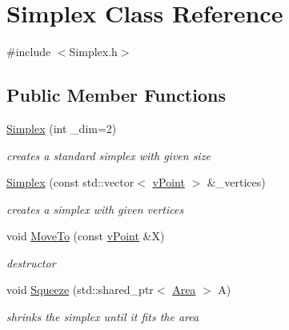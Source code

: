 \hypertarget{class_simplex}{}\section{Simplex Class Reference}
\label{class_simplex}


{\ttfamily \#include $<$Simplex.\+h$>$}

\subsection*{Public Member Functions}
\begin{DoxyCompactItemize}
\item 
\mbox{\label{class_simplex_a0556b901b7d46c7d4600aa5442f02585}} 
\hyperlink{class_simplex_a0556b901b7d46c7d4600aa5442f02585}{Simplex} (int \+\_\+dim=2)
\begin{DoxyCompactList}\small\item\em creates a standard simplex with given size \end{DoxyCompactList}\item 
\mbox{\label{class_simplex_ad227962dec843392bb95c02e106eb21c}} 
\hyperlink{class_simplex_ad227962dec843392bb95c02e106eb21c}{Simplex} (const std\+::vector$<$ \hyperlink{classv_point}{v\+Point} $>$ \&\+\_\+vertices)
\begin{DoxyCompactList}\small\item\em creates a simplex with given vertices \end{DoxyCompactList}\item 
void \hyperlink{class_simplex_a78284170bf58df27fcd5a8df6de283f3}{Move\+To} (const \hyperlink{classv_point}{v\+Point} \&X)
\begin{DoxyCompactList}\small\item\em destructor \end{DoxyCompactList}\item 
\mbox{\label{class_simplex_a8963be87ef81afde1c0865a71411eb1b}} 
void \hyperlink{class_simplex_a8963be87ef81afde1c0865a71411eb1b}{Squeeze} (std\+::shared\+\_\+ptr$<$ \hyperlink{class_area}{Area} $>$ A)
\begin{DoxyCompactList}\small\item\em shrinks the simplex until it fits the area \end{DoxyCompactList}\item 

\end{DoxyCompactItemize}

